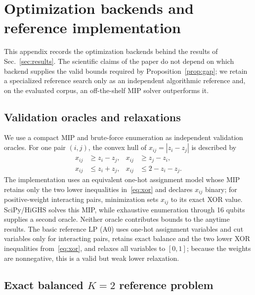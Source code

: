 \documentclass[
  aps,
  pra,
  reprint,
  amsmath,
  amssymb,
  longbibliography,
  nofootinbib,
  floatfix
]{revtex4-2}
\theoremstyle{plain}
\begin{document}
\appendix

\section{Optimization backends and reference implementation}
\label{app:backend}

This appendix records the optimization backends behind the results of Sec.~\ref{sec:results}. The scientific claims of the paper do not depend on which backend supplies the valid bounds required by Proposition~\ref{prop:gap}; we retain a specialized reference search only as an independent algorithmic reference and, on the evaluated corpus, an off-the-shelf MIP solver outperforms it.

\subsection{Validation oracles and relaxations}

We use a compact MIP and brute-force enumeration as independent validation oracles. For one pair $(i,j)$, the convex hull of $x_{ij}=|z_i-z_j|$ is described by
\begin{equation}
\begin{aligned}
  x_{ij} &\geq z_i-z_j, & x_{ij} &\geq z_j-z_i,\\
  x_{ij} &\leq z_i+z_j, & x_{ij} &\leq 2-z_i-z_j.
\end{aligned}
  \label{eq:xor}
\end{equation}
The implementation uses an equivalent one-hot assignment model whose MIP retains only the two lower inequalities in~\eqref{eq:xor} and declares $x_{ij}$ binary; for positive-weight interacting pairs, minimization sets $x_{ij}$ to its exact XOR value. SciPy/HiGHS solves this MIP, while exhaustive enumeration through 16 qubits supplies a second oracle. Neither oracle contributes bounds to the anytime results. The basic reference LP (A0) uses one-hot assignment variables and cut variables only for interacting pairs, retains exact balance and the two lower XOR inequalities from~\eqref{eq:xor}, and relaxes all variables to $[0,1]$; because the weights are nonnegative, this is a valid but weak lower relaxation.

\subsection{Exact balanced \texorpdfstring{$K=2$}{K=2} reference problem}
\end{document}
